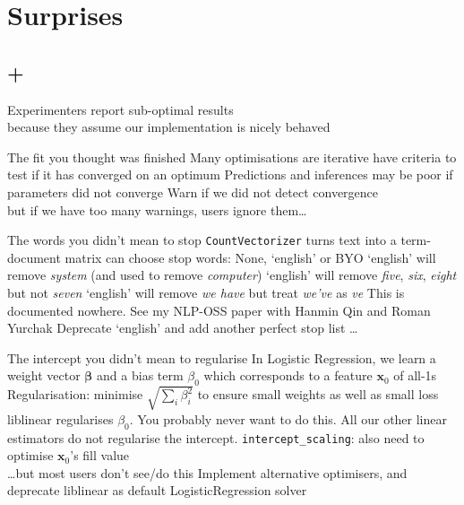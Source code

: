 \documentclass[aspectratio=169, 22pt]{beamer}
\newcommand{\hl}{\textcolor{usydred}}
\newenvironment{sectionslide}
			{\subsection*{+}\begin{frame}[fragile,environment=sectionslide]\vfill\begin{center}\Large}
			{\end{center}\vfill\end{frame}}
\begin{document}
\section{Surprises}

\begin{sectionslide}
	Experimenters report sub-optimal results\\
	because they assume our implementation is nicely behaved
\end{sectionslide}

\begin{points}{The fit you thought was finished}
	\p Many optimisations are iterative
	\p have criteria to test if it has converged on an optimum
	\p Predictions and inferences may be poor if parameters did not converge
	\p[Solution] Warn if we did not detect convergence \\
	but if we have too many warnings, users ignore them\ldots
\end{points}

\begin{points}{The words you didn't mean to stop}
	\p \verb|CountVectorizer| turns text into a term-document matrix
	\p can choose stop words: None, `english' or BYO
	\p `english' will remove \emph{system} (and used to remove \emph{computer})
	\p `english' will remove \emph{five}, \emph{six}, \emph{eight} but not \emph{seven}
	\p `english' will remove \emph{we have} but treat \emph{we've} as \emph{ve}
	\p This is documented nowhere.
	\p See my NLP-OSS paper with Hanmin Qin and Roman Yurchak
	\pause
	\p[Solution] Deprecate `english' 
	\pause and add another \hl{perfect} stop list \ldots
\end{points}

\begin{points}{The intercept you didn't mean to regularise}
	\p In Logistic Regression, we learn a weight vector $\mathbf{\beta}$
	\p and a bias term $\beta_0$ which corresponds to a feature $\mathbf{x}_0$ of all-1s
	\p Regularisation: minimise $\sqrt{\sum_i \beta_i^2}$ to ensure small weights as well as small loss 
	\p liblinear regularises $\beta_0$. You probably never want to do this.
	\p All our other linear estimators do not regularise the intercept.
	\pause
	\p[Sol'n 1] \verb|intercept_scaling|: also need to optimise $\mathbf{x}_0$'s fill value\\
	\pause
	\ldots but most users don't see/do this
	\p[Sol'n 2] Implement alternative optimisers, and deprecate liblinear as default LogisticRegression solver
\end{points}
\end{document}
